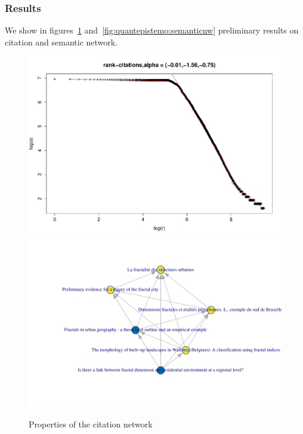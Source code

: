 \subsubsection{Results}


We show in figures~\ref{fig:quantepistemo:citnw} and~\ref{fig:quantepistemo:semanticnw} preliminary results on citation and semantic network.

\begin{figure}
\includegraphics[width=\textwidth]{Figures/PartI/QuantitativeEpistemo/HyperNetwork/rank-size-all}
\includegraphics[width=\textwidth]{Figures/PartI/QuantitativeEpistemo/HyperNetwork/cybclic_2cyb_13761}
\caption[Properties of the citation network]{Properties of the citation network}
\label{fig:quantepistemo:citnw}
\end{figure}


